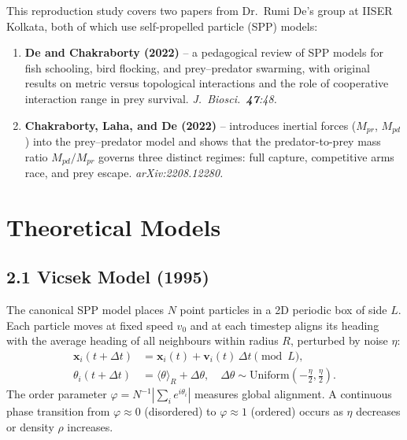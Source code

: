\documentclass[11pt,a4paper]{article}
\begin{document}
This reproduction study covers two papers from Dr.\ Rumi De's group at
IISER Kolkata, both of which use self-propelled particle (SPP) models:

\begin{enumerate}[leftmargin=*, itemsep=2pt]
  \item \textbf{De and Chakraborty (2022)} -- a pedagogical review of SPP
    models for fish schooling, bird flocking, and prey--predator swarming,
    with original results on metric versus topological interactions and the
    role of cooperative interaction range in prey survival.
    \textit{J.\ Biosci.\ \textbf{47}:48.}

  \item \textbf{Chakraborty, Laha, and De (2022)} -- introduces inertial
    forces ($M_{pr}$, $M_{pd}$) into the prey--predator model and shows
    that the predator-to-prey mass ratio $M_{pd}/M_{pr}$ governs three
    distinct regimes: full capture, competitive arms race, and prey escape.
    \textit{arXiv:2208.12280.}
\end{enumerate}

\section{Theoretical Models}

\subsection{2.1 Vicsek Model (1995)}

The canonical SPP model places $N$ point particles in a 2D periodic box of
side $L$. Each particle moves at fixed speed $v_0$ and at each timestep aligns
its heading with the average heading of all neighbours within radius $R$,
perturbed by noise $\eta$:
\begin{align}
  \mathbf{x}_i(t+\Delta t) &= \mathbf{x}_i(t) + \mathbf{v}_i(t)\,\Delta t
    \pmod{L}, \\
  \theta_i(t+\Delta t) &= \langle\theta\rangle_{R} + \Delta\theta,
    \quad \Delta\theta \sim \mathrm{Uniform}\!\left(-\tfrac{\eta}{2},\tfrac{\eta}{2}\right).
\end{align}
The order parameter $\varphi = N^{-1}|\sum_i e^{i\theta_i}|$ measures global
alignment. A continuous phase transition from $\varphi\approx 0$ (disordered)
to $\varphi\approx 1$ (ordered) occurs as $\eta$ decreases or density $\rho$
increases.
\end{document}

